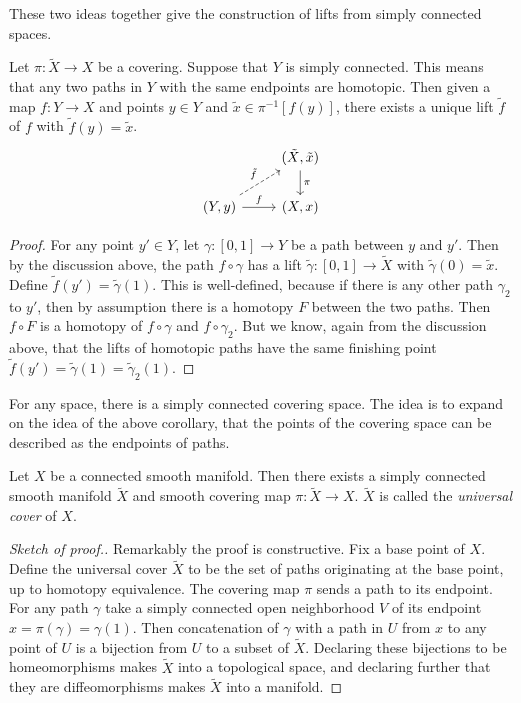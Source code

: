 These two ideas together give the construction of lifts from simply connected spaces.
\begin{corollary}
\textup{\cite[Prop~1.33]{Hatcher2002}}
Let $\pi : \tilde{X} \to X$ be a covering.
Suppose that $Y$ is simply connected.
This means that any two paths in $Y$ with the same endpoints are homotopic.
Then given a map $f : Y \to X$ and points $y \in Y$ and $\tilde{x} \in \pi^{-1}[f(y)]$, there exists a unique lift $\tilde{f}$ of $f$ with $\tilde{f}(y) = \tilde{x}$.
\[\begin{tikzcd}
& (\tilde{X},\tilde{x}) \arrow{d}{\pi} \\
(Y,y) \arrow{r}{f} \arrow[dashed]{ru}{\tilde{f}} & (X,x)
\end{tikzcd}\]
\end{corollary}
\begin{proof}
For any point $y' \in Y$, let $\gamma : [0,1] \to Y$ be a path between $y$ and $y'$.
Then by the discussion above, the path $f \circ \gamma$ has a lift $\tilde{\gamma} : [0,1] \to \tilde{X}$ with $\tilde{\gamma}(0) = \tilde{x}$.
Define $\tilde{f}(y') = \tilde{\gamma}(1)$.
This is well-defined, because if there is any other path $\gamma_2$ to $y'$, then by assumption there is a homotopy $F$ between the two paths.
Then $f\circ F$ is a homotopy of $f\circ\gamma$ and $f\circ\gamma_2$.
But we know, again from the discussion above, that the lifts of homotopic paths have the same finishing point $\tilde{f}(y') = \tilde{\gamma}(1) = \tilde{\gamma}_2(1)$.
\end{proof}

For any space, there is a simply connected covering space.
The idea is to expand on the idea of the above corollary, that the points of the covering space can be described as the endpoints of paths.

\begin{theorem}
\textup{\cite[p.63]{Hatcher2002}}
Let $X$ be a connected smooth manifold.
Then there exists a simply connected smooth manifold $\tilde{X}$ and smooth covering map $\pi : \tilde{X} \to X$.
$\tilde{X}$ is called the \emph{universal cover} of $X$. 
\end{theorem}
\begin{proof}[Sketch of proof.]
Remarkably the proof is constructive.
Fix a base point of $X$.
Define the universal cover $\tilde{X}$ to be the set of paths originating at the base point, up to homotopy equivalence.
The covering map $\pi$ sends a path to its endpoint.
For any path $\gamma$ take a simply connected open neighborhood $V$ of its endpoint $x = \pi(\gamma) = \gamma(1)$.
Then concatenation of $\gamma$ with a path in $U$ from $x$ to any point of $U$ is a bijection from $U$ to a subset of $\tilde{X}$.
Declaring these bijections to be homeomorphisms makes $\tilde{X}$ into a topological space, and declaring further that they are diffeomorphisms makes $\tilde{X}$ into a manifold.
\end{proof}

